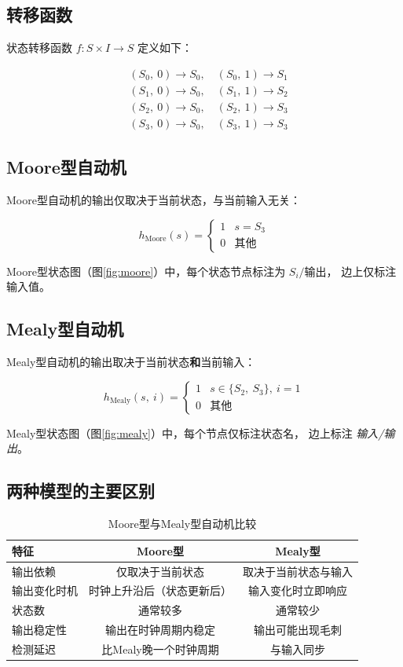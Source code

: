 \documentclass[12pt,a4paper]{article}
\begin{document}
\subsection{转移函数}

状态转移函数 $f: S \times I \to S$ 定义如下：

\[
\begin{aligned}
&(S_0,\ 0) \to S_0,\quad (S_0,\ 1) \to S_1 \\
&(S_1,\ 0) \to S_0,\quad (S_1,\ 1) \to S_2 \\
&(S_2,\ 0) \to S_0,\quad (S_2,\ 1) \to S_3 \\
&(S_3,\ 0) \to S_0,\quad (S_3,\ 1) \to S_3
\end{aligned}
\]

\subsection{Moore型自动机}

Moore型自动机的输出仅取决于当前状态，与当前输入无关：

\[
h_{\text{Moore}}(s) =
\begin{cases}
1 & s = S_3 \\
0 & \text{其他}
\end{cases}
\]

Moore型状态图（图\ref{fig:moore}）中，每个状态节点标注为 $S_i/\text{输出}$，
边上仅标注输入值。

\subsection{Mealy型自动机}

Mealy型自动机的输出取决于当前状态\textbf{和}当前输入：

\[
h_{\text{Mealy}}(s,\ i) =
\begin{cases}
1 & s \in \{S_2,\ S_3\},\ i = 1 \\
0 & \text{其他}
\end{cases}
\]

Mealy型状态图（图\ref{fig:mealy}）中，每个节点仅标注状态名，
边上标注 \textit{输入/输出}。

\subsection{两种模型的主要区别}

\begin{table}[H]
\centering
\caption{Moore型与Mealy型自动机比较}
\begin{tabular}{lcc}
\toprule
\textbf{特征} & \textbf{Moore型} & \textbf{Mealy型} \\
\midrule
输出依赖     & 仅取决于当前状态          & 取决于当前状态与输入 \\
输出变化时机 & 时钟上升沿后（状态更新后）  & 输入变化时立即响应 \\
状态数       & 通常较多                  & 通常较少 \\
输出稳定性   & 输出在时钟周期内稳定       & 输出可能出现毛刺 \\
检测延迟     & 比Mealy晚一个时钟周期      & 与输入同步 \\
\bottomrule
\end{tabular}
\end{table}
\end{document}
